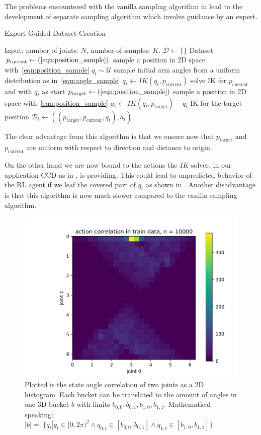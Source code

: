The problems encountered with the vanilla sampling algorithm in  lead to the development of separate sampling algorithm which involve guidance by an expert. 

\begin{algorithm}
    \caption{Expert Guided Dataset Creation}\label{alg:Expert_Dataset}
    \begin{algorithmic}
        \State{} Input: number of joints: $N$, number of samples: $K$.
        \State{} $\mathcal{D} \leftarrow \{\}$  Dataset
            \State{} $p_{\text{current}} \leftarrow (\text{\ref{eqn:position_sample}})$ sample a position in 2D space with~\eqref{eqn:position_sample}
            \State{} $q_t \sim \mathcal{U}$ sample initial arm angles from a uniform distribution as in~\eqref{eqn:angle_sample}
            \State{} $q_t \leftarrow IK(q_t, p_{\text{current}})$ solve IK for $p_{\text{current}}$ and with $q_t$ as start
            \State{} $p_{\text{target}} \leftarrow (\text{\ref{eqn:position_sample}})$ sample a position in 2D space with~\eqref{eqn:position_sample}
            \State{} $a_t \leftarrow IK(q_t, p_{\text{target}}) - q_t$ IK for the target position
            \State{} $\mathcal{D}_i \leftarrow ((p_{\text{target}}, p_{\text{current}}, q_t), a_t)$
        \EndFor{}
\end{algorithmic}
\end{algorithm}
The clear advantage from this algorithm is that we ensure now that $p_{\text{target}}$ and $p_{\text{current}}$ are uniform with respect to direction and distance to origin.

On the other hand we are now  bound to the actions the $IK$-solver, in our application CCD as in , is providing. This could lead to unpredicted behavior of the RL agent if we leaf the covered part of $q_t$ as shown in . Another disadvantage is that this algorithm is now much slower compared to the vanilla sampling algorithm. 
\begin{figure}
    \begin{center}
        \includegraphics[width=0.46 \linewidth]{figures/methodology/dataset/action_correlation.png}
    \end{center}
    \caption[action correlation CCD]{Plotted is the state angle correlation of two joints as a 2D histogram. Each bucket can be translated to the amount of angles in one 3D bucket $b$ with limits $b_{0, 0}, b_{0, 1}, b_{1, 0}, b_{1, 1}$. Mathematical speaking: $|b| = |\{q_t | q_t \in [0, 2\pi)^2 \land q_{0, t} \in [b_{0, 0}, b_{0, 1}] \land q_{1, t} \in [b_{1, 0}, b_{1, 1}]\}|$}
    \label{fig:dataset_action_correlation}
\end{figure}

